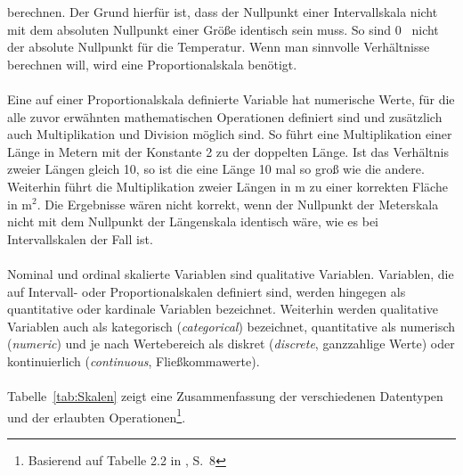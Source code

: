 berechnen. Der Grund hierfür ist, dass der Nullpunkt einer Intervallskala nicht
mit dem absoluten Nullpunkt einer Größe identisch sein muss. So sind
0~ nicht der absolute Nullpunkt für die Temperatur. Wenn man sinnvolle
Verhältnisse berechnen will, wird eine Proportionalskala benötigt. \\ \\
Eine auf einer Proportionalskala definierte Variable hat numerische Werte, für
die alle zuvor erwähnten mathematischen Operationen definiert sind und
zusätzlich auch Multiplikation und Division möglich sind.
So führt eine
Multiplikation einer Länge in Metern mit der Konstante 2 zu der doppelten Länge.
Ist das Verhältnis zweier Längen gleich 10, so ist die eine Länge 10
mal so groß wie die andere. Weiterhin führt die Multiplikation zweier Längen
in m zu einer korrekten Fläche in $\textrm{m}^2$. Die Ergebnisse wären nicht
korrekt, wenn der Nullpunkt der Meterskala nicht mit dem Nullpunkt der
Längenskala identisch wäre, wie es bei Intervallskalen der Fall ist. \\ \\
Nominal und ordinal skalierte Variablen sind qualitative Variablen.
Variablen, die auf Intervall- oder Proportionalskalen definiert sind, werden
hingegen als quantitative oder kardinale Variablen bezeichnet.
Weiterhin werden qualitative Variablen auch als kategorisch
(\emph{categorical}) bezeichnet, quantitative als numerisch (\emph{numeric})
und je nach Wertebereich als diskret (\emph{discrete}, ganzzahlige Werte) oder
kontinuierlich (\emph{continuous}, Fließkommawerte). \\ \\
Tabelle~\ref{tab:Skalen} zeigt eine Zusammenfassung der verschiedenen Datentypen
und der erlaubten Operationen\footnote{
Basierend auf Tabelle 2.2 in \cite{Runkler}, S.~8}.
